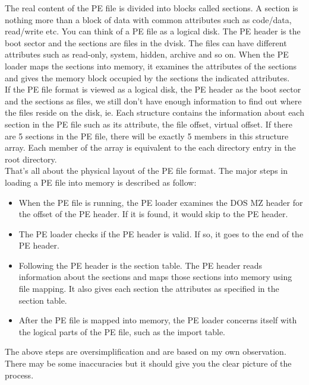 The real content of the PE file is divided into blocks called sections. A section is nothing more than a block of data with common attributes such as code/data, read/write etc. You can think of a PE file as a logical disk. The PE header is the boot sector and the sections are files in the dvisk. The files can have different attributes such as read-only, system, hidden, archive and so on. When the PE loader maps the sections into memory, it examines the attributes of the sections and gives the memory block occupied by the sections the indicated attributes.\\
If the PE file format is viewed as a logical disk, the PE header as the boot sector and the sections as files, we still don't have enough information to find out where the files reside on the disk, ie. Each structure contains the information about each section in the PE file such as its attribute, the file offset, virtual offset. If there are 5 sections in the PE file, there will be exactly 5 members in this structure array. Each member of the array is equivalent to the each directory entry in the root directory.\\
That's all about the physical layout of the PE file format. The major steps in loading a PE file into memory is described as follow:\\
\begin{itemize}
\item When the PE file is running, the PE loader examines the DOS MZ header for the offset of the PE header. If it is found, it would skip to the PE header.
\item The PE loader checks if the PE header is valid. If so, it goes to the end of the PE header.
\item Following the PE header is the section table. The PE header reads information about the sections and maps those sections into memory using file mapping. It also gives each section the attributes as specified in the section table.
\item After the PE file is mapped into memory, the PE loader concerns itself with the logical parts of the PE file, such as the import table.
\end{itemize}
The above steps are oversimplification and are based on my own observation. There may be some inaccuracies but it should give you the clear picture of the process.
